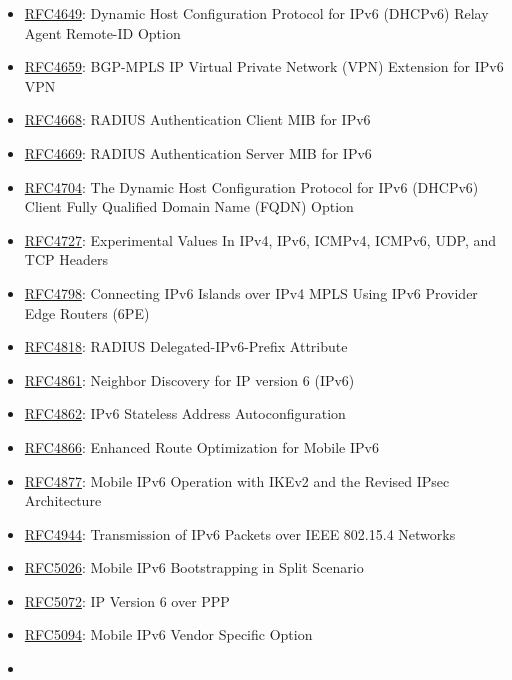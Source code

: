 \documentclass[
]{article}
\begin{document}
\begin{itemize}
\item
  \href{https://www.rfc-editor.org/info/rfc4649}{RFC4649}: Dynamic Host
  Configuration Protocol for IPv6 (DHCPv6) Relay Agent Remote-ID Option
\item
  \href{https://www.rfc-editor.org/info/rfc4659}{RFC4659}: BGP-MPLS IP
  Virtual Private Network (VPN) Extension for IPv6 VPN
\item
  \href{https://www.rfc-editor.org/info/rfc4668}{RFC4668}: RADIUS
  Authentication Client MIB for IPv6
\item
  \href{https://www.rfc-editor.org/info/rfc4669}{RFC4669}: RADIUS
  Authentication Server MIB for IPv6
\item
  \href{https://www.rfc-editor.org/info/rfc4704}{RFC4704}: The Dynamic
  Host Configuration Protocol for IPv6 (DHCPv6) Client Fully Qualified
  Domain Name (FQDN) Option
\item
  \href{https://www.rfc-editor.org/info/rfc4727}{RFC4727}: Experimental
  Values In IPv4, IPv6, ICMPv4, ICMPv6, UDP, and TCP Headers
\item
  \href{https://www.rfc-editor.org/info/rfc4798}{RFC4798}: Connecting
  IPv6 Islands over IPv4 MPLS Using IPv6 Provider Edge Routers (6PE)
\item
  \href{https://www.rfc-editor.org/info/rfc4818}{RFC4818}: RADIUS
  Delegated-IPv6-Prefix Attribute
\item
  \href{https://www.rfc-editor.org/info/rfc4861}{RFC4861}: Neighbor
  Discovery for IP version 6 (IPv6)
\item
  \href{https://www.rfc-editor.org/info/rfc4862}{RFC4862}: IPv6
  Stateless Address Autoconfiguration
\item
  \href{https://www.rfc-editor.org/info/rfc4866}{RFC4866}: Enhanced
  Route Optimization for Mobile IPv6
\item
  \href{https://www.rfc-editor.org/info/rfc4877}{RFC4877}: Mobile IPv6
  Operation with IKEv2 and the Revised IPsec Architecture
\item
  \href{https://www.rfc-editor.org/info/rfc4944}{RFC4944}: Transmission
  of IPv6 Packets over IEEE 802.15.4 Networks
\item
  \href{https://www.rfc-editor.org/info/rfc5026}{RFC5026}: Mobile IPv6
  Bootstrapping in Split Scenario
\item
  \href{https://www.rfc-editor.org/info/rfc5072}{RFC5072}: IP Version 6
  over PPP
\item
  \href{https://www.rfc-editor.org/info/rfc5094}{RFC5094}: Mobile IPv6
  Vendor Specific Option
\item

\end{itemize}
\end{document}
